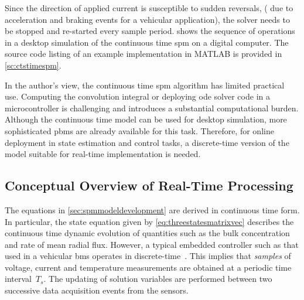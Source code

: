 Since  the direction  of applied  current  is susceptible  to sudden  reversals,
(\eg{}  due to  acceleration and  braking events  for a  vehicular application),
the  solver   needs  to   be  stopped  and   re-started  every   sample  period.
 shows the  sequence of operations in  a desktop simulation
of  the  continuous time  \gls{spm}  on  a  digital  computer. The  source  code
listing  of  an  example  implementation   in  \textsc{MATLAB}  is  provided  in
\cref{sc:ctstimespm}.


In  the author's  view,  the  continuous time  \gls{spm}  algorithm has  limited
practical  use.  Computing  the  convolution  integral  or  deploying  \gls{ode}
solver code  in a  microcontroller is challenging  and introduces  a substantial
computational burden. Although the continuous time model can be used for desktop
simulation, more sophisticated \glspl{pbm} are  already available for this task.
Therefore,  for online  deployment  in  state estimation  and  control tasks,  a
discrete-time  version of  the model  suitable for  real-time implementation  is
needed.


\subsection{Conceptual Overview of Real-Time Processing}

The equations  in \cref{sec:spmmodeldevelopment} are derived  in continuous time
form. In particular, the  state equation given by \cref{eq:threestatesmatrixvec}
describes  the  continuous   time  dynamic  evolution  of   quantities  such  as
the  bulk  concentration and  rate  of  mean  radial  flux. However,  a  typical
embedded  controller such  as that  used in  a vehicular  \gls{bms} operates  in
discrete-time~\cite{Andrea2010}.  This implies  that \emph{samples}  of voltage,
current  and   temperature  measurements  are   obtained  at  a   periodic  time
interval~$T_s$. The  updating of  solution variables  are performed  between two
successive data acquisition events from the sensors.



